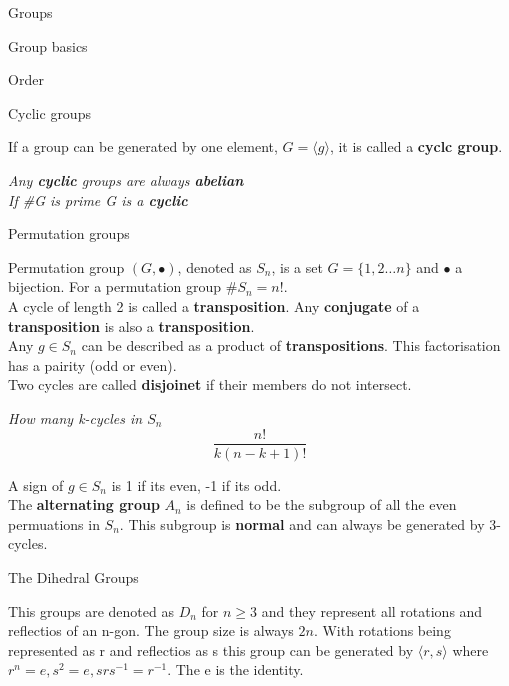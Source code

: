 \documentclass[12pt, letterpaper]{article}
\begin{document}
\begin{section}{Groups}
\begin{subsection}{Group basics}
\begin{subsubsection}{Order}
    \end{subsubsection}

    \begin{subsubsection}{Cyclic groups}

      If a group can be generated by one element, \(G = \langle g \rangle\),
      it is called a \textbf{cyclc group}.

      \emph{Any \textbf{cyclic} groups are always \textbf{abelian}} \\
      \emph{If \#G is prime G is a \textbf{cyclic}}

    \end{subsubsection}

    \begin{subsubsection}{Permutation groups}

      Permutation group \((G, \bullet)\), denoted as \(S_{n}\), is a set
      \(G = \{ 1, 2 \dots n \}\) and \(\bullet\) a bijection.
      For a permutation group \(\#S_{n} = n!\). \\
      A cycle of length 2 is called a \textbf{transposition}. Any \textbf{conjugate}
      of a \textbf{transposition} is also a \textbf{transposition}. \\
      Any \(g \in S_{n}\) can be described as a product of \textbf{transpositions}.
      This factorisation has a pairity (odd or even). \\
      Two cycles are called \textbf{disjoinet} if their members do not intersect.

      \emph{How many k-cycles in \(S_{n}\) \[\frac{n!}{k(n-k+1)!}\]}

      A sign of \(g \in S_{n}\) is 1 if its even, -1 if its odd. \\
      The \textbf{alternating group} \(A_{n}\) is defined to be the subgroup of
      all the even permuations in \(S_{n}\). This subgroup is \textbf{normal} and
      can always be generated by 3-cycles.

    \end{subsubsection}

    \begin{subsubsection}{The Dihedral Groups}

      This groups are denoted as \(D_{n}\) for \(n \geq 3\) and they represent
      all rotations and reflectios of an n-gon. The group size is always \(2n\).
      With rotations being represented as r and reflectios as s this group can be
      generated by \(\langle r, s \rangle\) where \(r^{n} = e, s^{2} = e, srs^{-1} = r^{-1}\).
      The e is the identity.


\end{subsubsection}
\end{subsection}
\end{section}
\end{document}
